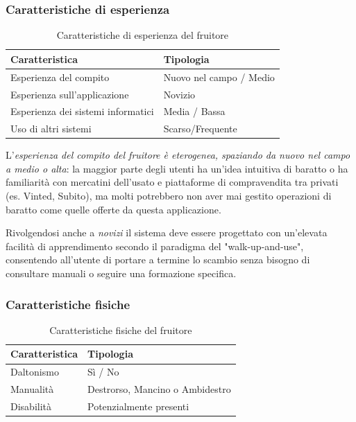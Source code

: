 \subsubsection{Caratteristiche di esperienza}
\begin{table}[H]
    \centering
    \begin{tabular}{@{}>{\raggedright\arraybackslash}p{7cm}>{\raggedright\arraybackslash}p{5cm}@{}}
        \toprule
        \textbf{Caratteristica}            & \textbf{Tipologia}      \\ \midrule
        Esperienza del compito             & Nuovo nel campo / Medio \\
        Esperienza sull'applicazione       & Novizio                 \\
        Esperienza dei sistemi informatici & Media / Bassa           \\
        Uso di altri sistemi               & Scarso/Frequente        \\ \bottomrule
    \end{tabular}
    \caption{Caratteristiche di esperienza del fruitore}
\end{table}

L'\emph{esperienza del compito del fruitore è eterogenea, spaziando da nuovo nel campo a medio o alta}: la maggior parte degli utenti ha un'idea intuitiva di baratto o ha familiarità con mercatini dell'usato e piattaforme di compravendita tra privati (es. Vinted, Subito), ma molti potrebbero non aver mai gestito operazioni di baratto come quelle offerte da questa applicazione.

Rivolgendosi anche a \emph{novizi} il sistema deve essere progettato con un'elevata facilità di apprendimento secondo il paradigma del "walk-up-and-use", consentendo all'utente di portare a termine lo scambio senza bisogno di consultare manuali o seguire una formazione specifica.

\subsubsection{Caratteristiche fisiche}
\begin{table}[H]
    \centering
    \begin{tabular}{@{}>{\raggedright\arraybackslash}p{4cm}>{\raggedright\arraybackslash}p{8cm}@{}}
        \toprule
        \textbf{Caratteristica} & \textbf{Tipologia}              \\ \midrule
        Daltonismo              & Sì / No                         \\
        Manualità               & Destrorso, Mancino o Ambidestro \\
        Disabilità              & Potenzialmente presenti         \\ \bottomrule
    \end{tabular}
    \caption{Caratteristiche fisiche del fruitore}
\end{table}

